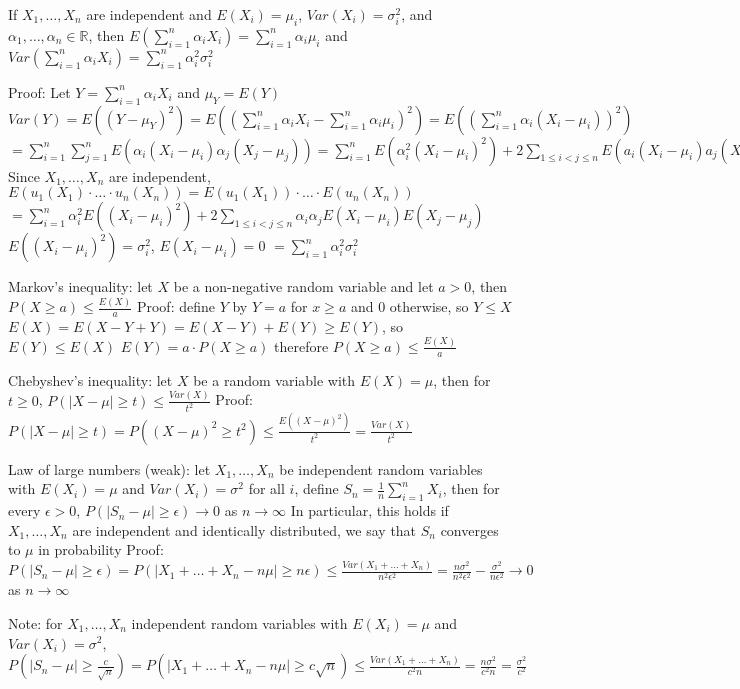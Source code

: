 \documentclass{article}
\begin{document}
If $X_1,\dots,X_n$ are independent and $E(X_i)=\mu_i$, $Var(X_i)=\sigma_i^2$, and $\alpha_1,\dots,\alpha_n\in\mathbb{R}$, then $E(\sum_{i=1}^n\alpha_iX_i)=\sum_{i=1}^n\alpha_i\mu_i$ and $Var(\sum_{i=1}^n\alpha_iX_i)=\sum_{i=1}^n\alpha_i^2\sigma_i^2$

Proof:
Let $Y=\sum_{i=1}^n\alpha_iX_i$ and $\mu_Y=E(Y)$
$Var(Y)=E((Y-\mu_Y)^2)=E((\sum_{i=1}^n\alpha_iX_i-\sum_{i=1}^n\alpha_i\mu_i)^2)=E((\sum_{i=1}^n\alpha_i(X_i-\mu_i))^2)$
$=\sum_{i=1}^n\sum_{j=1}^nE(\alpha_i(X_i-\mu_i)\alpha_j(X_j-\mu_j))=\sum_{i=1}^nE(\alpha_i^2(X_i-\mu_i)^2)+2\sum_{1\le i<j\le n}E(a_i(X_i-\mu_i)a_j(X_j-\mu_j))$
Since $X_1,\dots,X_n$ are independent, $E(u_1(X_1)\cdot\dots\cdot u_n(X_n))=E(u_1(X_1))\cdot\dots\cdot E(u_n(X_n))$
$=\sum_{i=1}^n\alpha_i^2E((X_i-\mu_i)^2)+2\sum_{1\le i<j\le n}\alpha_i\alpha_jE(X_i-\mu_i)E(X_j-\mu_j)$
$E((X_i-\mu_i)^2)=\sigma_i^2$, $E(X_i-\mu_i)=0$
$=\sum_{i=1}^n\alpha_i^2\sigma_i^2$

Markov's inequality: let $X$ be a non-negative random variable and let $a>0$, then $P(X\ge a)\le\frac{E(X)}{a}$
Proof: define $Y$ by $Y=a$ for $x\ge a$ and $0$ otherwise, so $Y\le X$
$E(X)=E(X-Y+Y)=E(X-Y)+E(Y)\ge E(Y)$, so $E(Y)\le E(X)$
$E(Y)=a\cdot P(X\ge a)$ therefore $P(X\ge a)\le\frac{E(X)}{a}$

Chebyshev's inequality: let $X$ be a random variable with $E(X)=\mu$, then for $t\ge0$, $P(\lvert X-\mu\rvert\ge t)\le\frac{Var(X)}{t^2}$
Proof: $P(\lvert X-\mu\rvert\ge t)=P((X-\mu)^2\ge t^2)\le\frac{E((X-\mu)^2)}{t^2}=\frac{Var(X)}{t^2}$

Law of large numbers (weak): let $X_1,\dots,X_n$ be independent random variables with $E(X_i)=\mu$ and $Var(X_i)=\sigma^2$ for all $i$, define $S_n=\frac{1}{n}\sum_{i=1}^nX_i$, then for every $\epsilon>0$, $P(\lvert S_n-\mu\rvert\ge\epsilon)\to0$ as $n\to\infty$
In particular, this holds if $X_1,\dots,X_n$ are independent and identically distributed, we say that $S_n$ converges to $\mu$ in probability
Proof: $P(\lvert S_n-\mu\rvert\ge\epsilon)=P(\lvert X_1+\dots+X_n-n\mu\rvert\ge n\epsilon)\le\frac{Var(X_1+\dots+X_n)}{n^2\epsilon^2}=\frac{n\sigma^2}{n^2\epsilon^2}-\frac{\sigma^2}{n\epsilon^2}\to0$ as $n\to\infty$

Note: for $X_1,\dots,X_n$ independent random variables with $E(X_i)=\mu$ and $Var(X_i)=\sigma^2$, $P(\lvert S_n-\mu\rvert\ge\frac{c}{\sqrt{n}})=P(\lvert X_1+\dots+X_n-n\mu\rvert\ge c\sqrt{n})\le\frac{Var(X_1+\dots+X_n)}{c^2n}=\frac{n\sigma^2}{c^2n}=\frac{\sigma^2}{c^2}$
\end{document}

